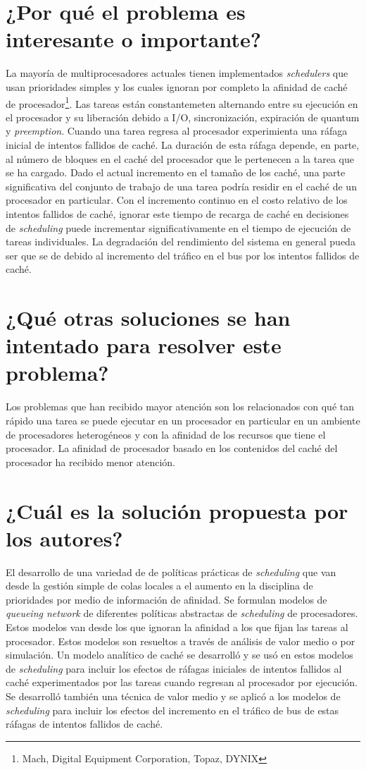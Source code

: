\section{¿Por qué el problema es interesante o importante?}
La mayoría de multiprocesadores actuales tienen implementados \textit{schedulers} que usan prioridades simples y los cuales ignoran por completo la afinidad de caché de procesador\footnote{Mach, Digital Equipment Corporation, Topaz, DYNIX}.
Las tareas están constantemeten alternando entre su ejecución en el procesador y su liberación debido a I/O, sincronización, expiración de quantum y \textit{preemption}. Cuando una tarea regresa al procesador experimienta una ráfaga inicial de intentos fallidos de caché. La duración de esta ráfaga depende, en parte, al número de bloques en el caché del procesador que le pertenecen a la tarea que se ha cargado. Dado el actual incremento en el tamaño de los caché, una parte significativa del conjunto de trabajo de una tarea podría residir en el caché de un procesador en particular. Con el incremento continuo en el costo relativo de los intentos fallidos de caché, ignorar este tiempo de recarga de caché en decisiones de \textit{scheduling} puede incrementar significativamente en el tiempo de ejecución de tareas individuales. La degradación del rendimiento del sistema en general pueda ser que se de debido al incremento del tráfico en el bus por los intentos fallidos de caché.

\section{¿Qué otras soluciones se han intentado para resolver este problema?}
Los problemas que han recibido mayor atención son los relacionados con qué tan rápido una tarea se puede ejecutar en un procesador en particular en un ambiente de procesadores heterogéneos y con la afinidad de los recursos que tiene el procesador. La afinidad de procesador basado en los contenidos del caché del procesador ha recibido menor atención.
     
\section{¿Cuál es la solución propuesta por los autores?}
El desarrollo de una variedad de de políticas prácticas de \textit{scheduling} que van desde la gestión simple de colas locales a el aumento en la disciplina de prioridades por medio de información de afinidad.
Se formulan modelos de \textit{queueing network} de diferentes políticas abstractas de \textit{scheduling} de procesadores. Estos modelos van desde los que ignoran la afinidad a los que fijan las tareas al procesador. Estos modelos son resueltos a través de análisis de valor medio o por simulación. Un modelo analítico de caché se desarrolló y se usó en estos modelos de \textit{scheduling} para incluir los efectos de ráfagas iniciales de intentos fallidos al caché experimentados por las tareas cuando regresan al procesador por ejecución. Se desarrolló también una técnica de valor medio y se aplicó a los modelos de \textit{scheduling} para incluir los efectos del incremento en el tráfico de bus de estas ráfagas de intentos fallidos de caché.


